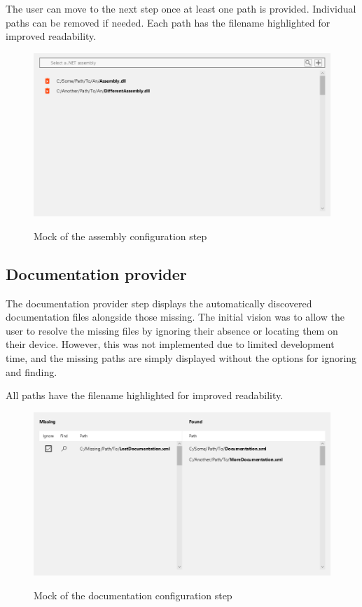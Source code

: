 The user can move to the next step once at least one path is provided. Individual paths can be removed if needed. Each path has the filename highlighted for improved readability.

\begin{figure}[H]
    \includegraphics[width=\linewidth]{img/mockMember provider.png}
    \label{fig:pluginMember}
    \caption{Mock of the assembly configuration step}
\end{figure}

\pagebreak
\subsection{Documentation provider}

The documentation provider step displays the automatically discovered documentation files alongside those missing. The initial vision was to allow the user to resolve the missing files by ignoring their absence or locating them on their device. However, this was not implemented due to limited development time, and the missing paths are simply displayed without the options for ignoring and finding.

All paths have the filename highlighted for improved readability.

\begin{figure}[H]
    \includegraphics[width=\linewidth]{img/mockDocumentation provider.png}
    \label{fig:pluginDocumentation}
    \caption{Mock of the documentation configuration step}
\end{figure}

